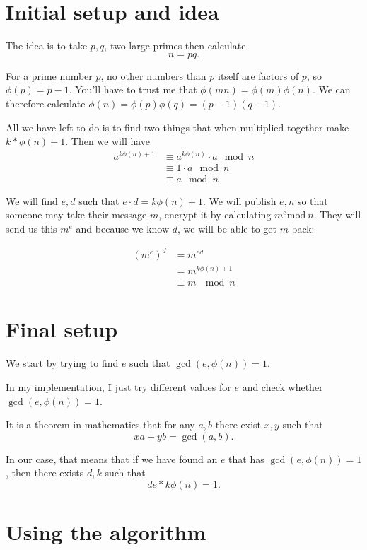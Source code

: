 \documentclass{article}
\begin{document}
\section{Initial setup and idea}
 The idea is to take $p,q$, two large primes
 then calculate \[n = pq.\]

 For a prime number $p$, no other numbers than $p$ itself are factors of $p$, so $\phi(p) = p-1$.  You'll have to trust me that $\phi(mn) = \phi(m)\phi(n)$.  We can therefore calculate $\phi(n) = \phi(p)\phi(q) = (p-1)(q-1)$.
 

 All we have left to do is to find two things that when multiplied together make $k*\phi(n) + 1$.
 Then we will have 
\begin{align}
    a^{k\phi(n) + 1} &\equiv a^{k\phi(n)}\cdot a \mod{n} \\
                     &\equiv 1 \cdot a \mod{n} \\
                     &\equiv a \mod{n}
\end{align}

We will find $e,d$ such that $e\cdot d = k\phi(n) + 1$.  We will publish $e,n$ so that someone may take their message $m$, encrypt it by calculating $m^e \mathrm{mod}\ n$.  They will send us this $m^e$ and because we know $d$, we will be able to get $m$ back:

\begin{align}
    (m^e)^d &= m^{ed} \\
            &= m^{k\phi(n) + 1} \\
            &\equiv m\ \mod{n}
\end{align}

\section{Final setup}

 We start by trying to find $e$ such that $\gcd(e,\phi(n)) = 1$.
 
In my implementation, I just try different values for $e$ and check whether $\gcd(e, \phi(n)) = 1$.

It is a theorem in mathematics that for any $a, b$ there exist $x, y$ such that
\[xa + yb = \gcd(a,b).\]

In our case, that means that if we have found an $e$ that has $\gcd(e, \phi(n)) = 1$, then there exists $d,k$ such that
\[de * k\phi(n) = 1.\]

\section{Using the algorithm}
\end{document}
